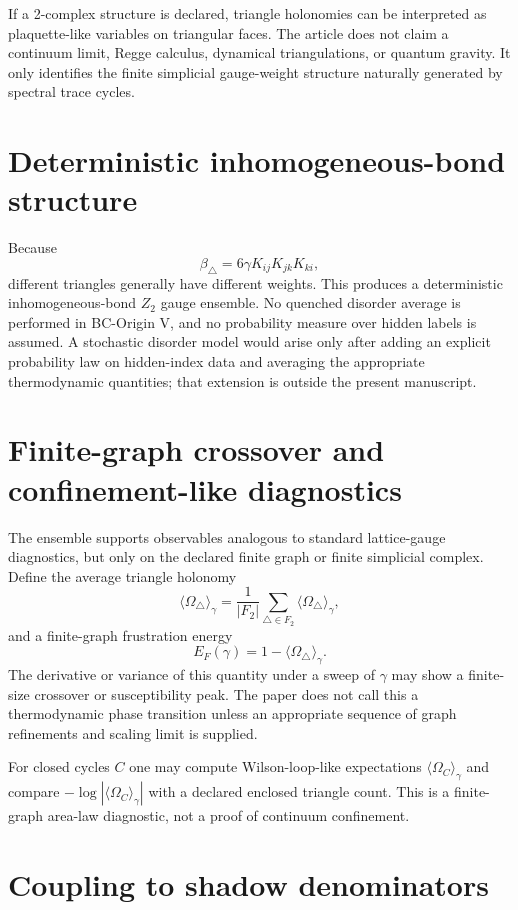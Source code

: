 \documentclass[11pt]{article}
\begin{document}
If a 2-complex structure is declared, triangle holonomies can be interpreted as plaquette-like variables on triangular faces. The article does not claim a continuum limit, Regge calculus, dynamical triangulations, or quantum gravity. It only identifies the finite simplicial gauge-weight structure naturally generated by spectral trace cycles.

\section{Deterministic inhomogeneous-bond structure}

Because
\[
\beta_\triangle=6\gamma K_{ij}K_{jk}K_{ki},
\]
different triangles generally have different weights. This produces a deterministic inhomogeneous-bond $Z_2$ gauge ensemble. No quenched disorder average is performed in BC-Origin V, and no probability measure over hidden labels is assumed. A stochastic disorder model would arise only after adding an explicit probability law on hidden-index data and averaging the appropriate thermodynamic quantities; that extension is outside the present manuscript.

\section{Finite-graph crossover and confinement-like diagnostics}

The ensemble supports observables analogous to standard lattice-gauge diagnostics, but only on the declared finite graph or finite simplicial complex. Define the average triangle holonomy
\[
\langle\Omega_\triangle\rangle_\gamma
=\frac{1}{|F_2|}\sum_{\triangle\in F_2}\langle\Omega_\triangle\rangle_\gamma,
\]
and a finite-graph frustration energy
\[
E_F(\gamma)=1-\langle\Omega_\triangle\rangle_\gamma.
\]
The derivative or variance of this quantity under a sweep of $\gamma$ may show a finite-size crossover or susceptibility peak. The paper does not call this a thermodynamic phase transition unless an appropriate sequence of graph refinements and scaling limit is supplied.

For closed cycles $C$ one may compute Wilson-loop-like expectations $\langle\Omega_C\rangle_\gamma$ and compare $-\log|\langle\Omega_C\rangle_\gamma|$ with a declared enclosed triangle count. This is a finite-graph area-law diagnostic, not a proof of continuum confinement.

\section{Coupling to shadow denominators}
\end{document}
